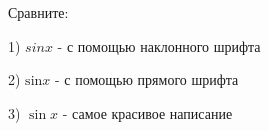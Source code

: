 \documentclass[a4paper, 12pt]{article}
\begin{document}
    Сравните:

    1) $sin x$ - с помощью наклонного шрифта

    2) $\mathrm{sin}{x}$ - с помощью прямого шрифта

    3) $\sin{x}$ - самое красивое написание
\end{document}
